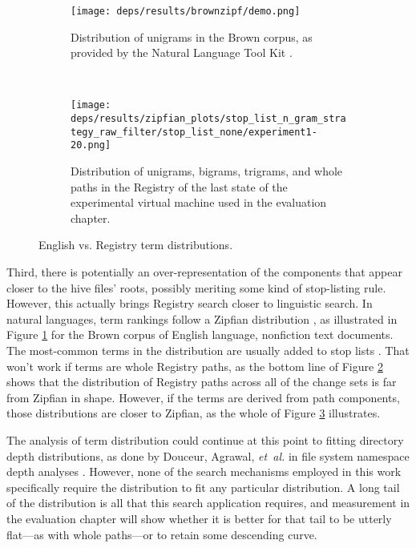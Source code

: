\documentclass[11pt]{ucthesis}
\theoremstyle{plain}
\theoremstyle{definition}
\newcommand{\etal}{\emph{et~al.}\xspace}
\begin{document}
\begin{figure}
  \centering
  \begin{subfigure}[b]{0.7\textwidth}
    \texttt{[image: deps/results/brownzipf/demo.png]}
    \caption{Distribution of unigrams in the Brown corpus, as provided by the Natural Language Tool Kit \cite{bird:colingacl06}.}
    \label{fig:englishvsregistrytermdistns:english}
  \end{subfigure}
  ~
  \begin{subfigure}[b]{0.7\textwidth}
    \texttt{[image: deps/results/zipfian\_plots/stop\_list\_n\_gram\_strategy\_raw\_filter/stop\_list\_none/experiment1-20.png]}
    \caption{Distribution of unigrams, bigrams, trigrams, and whole paths in the Registry of the last state of the experimental virtual machine used in the evaluation chapter.}
    \label{fig:englishvsregistrytermdistns:evalreg}
  \end{subfigure}
  \caption{\label{fig:englishvsregistrytermdistns}English vs. Registry term distributions.}
\end{figure}

Third, there is potentially an over-representation of the components that appear closer to the hive files' roots, possibly meriting some kind of stop-listing rule.  However, this actually brings Registry search closer to linguistic search.  In natural languages, term rankings follow a Zipfian distribution \cite{manning:mitpress99}, as illustrated in Figure \ref{fig:englishvsregistrytermdistns:english} for the Brown corpus of English language, nonfiction text documents.  The most-common terms in the distribution are usually added to stop lists \cite{croft:addison-wesley10}.  That won't work if terms are whole Registry paths, as the bottom line of Figure \ref{fig:englishvsregistrytermdistns:evalreg} shows that the distribution of Registry paths across all of the change sets is far from Zipfian in shape.  However, if the terms are derived from path components, those distributions are closer to Zipfian, as the whole of Figure \ref{fig:englishvsregistrytermdistns} illustrates.

The analysis of term distribution could continue at this point to fitting directory depth distributions, as done by Douceur, Agrawal, \etal in file system namespace depth analyses \cite{douceur:sigmetrics99,agrawal:fast07}.  However, none of the search mechanisms employed in this work specifically require the distribution to fit any particular distribution.  A long tail of the distribution is all that this search application requires, and measurement in the evaluation chapter will show whether it is better for that tail to be utterly flat---as with whole paths---or to retain some descending curve.
\end{document}
